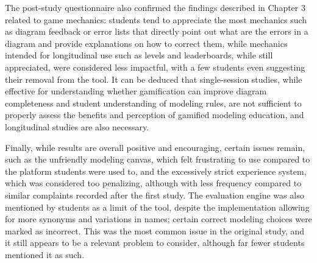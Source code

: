 The post-study questionnaire also confirmed the findings described in Chapter 3 related to game mechanics: students tend to appreciate the most mechanics such as diagram feedback or error lists that directly point out what are the errors in a diagram and provide explanations on how to correct them, while mechanics intended for longitudinal use such as levels and leaderboards, while still appreciated, were considered less impactful, with a few students even suggesting their removal from the tool. It can be deduced that single-session studies, while effective for understanding whether gamification can improve diagram completeness and student understanding of modeling rules, are not sufficient to properly assess the benefits and perception of gamified modeling education, and longitudinal studies are also necessary.

Finally, while results are overall positive and encouraging, certain issues remain, such as the unfriendly modeling canvas, which felt frustrating to use compared to the platform students were used to, and the excessively strict experience system, which was considered too penalizing, although with less frequency compared to similar complaints recorded after the first study. The evaluation engine was also mentioned by students as a limit of the tool, despite the implementation allowing for more synonyms and variations in names; certain correct modeling choices were marked as incorrect. This was the most common issue in the original study, and it still appears to be a relevant problem to consider, although far fewer students mentioned it as such.


